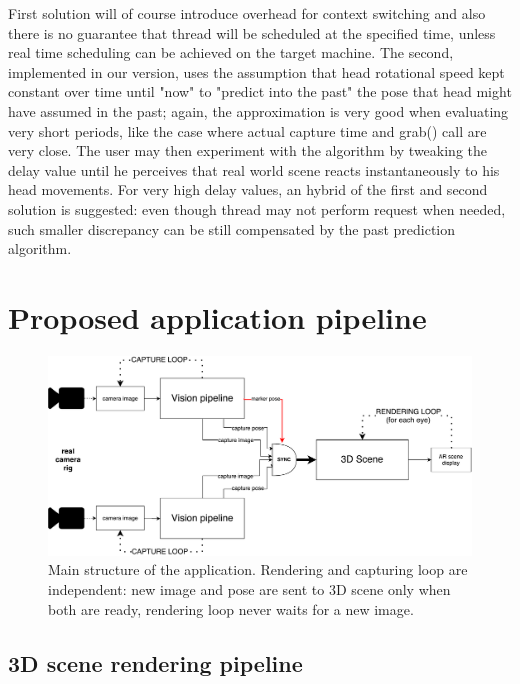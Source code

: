 First solution will of course introduce overhead for context switching and also there is no guarantee that thread will be scheduled at the specified time, unless real time scheduling can be achieved on the target machine. The second, implemented in our version, uses the assumption that head rotational speed kept constant over time until "now" to "predict into the past" the pose that head might have assumed in the past; again, the approximation is very good when evaluating very short periods, like the case where actual capture time and grab() call are very close. The user may then experiment with the algorithm by tweaking the delay value until he perceives that real world scene reacts instantaneously to his head movements. For very high delay values, an hybrid of the first and second solution is suggested: even though thread may not perform request when needed, such smaller discrepancy can be still compensated by the past prediction algorithm.

\section{Proposed application pipeline}

\begin{figure}[h!]
\centering
\includegraphics[width=\linewidth]{schemas/application-schema}
\caption{Main structure of the application. Rendering and capturing loop are independent: new image and pose are sent to 3D scene only when both are ready, rendering loop never waits for a new image.}
\label{fig:app_architecture}
\end{figure}

\subsection{3D scene rendering pipeline}


